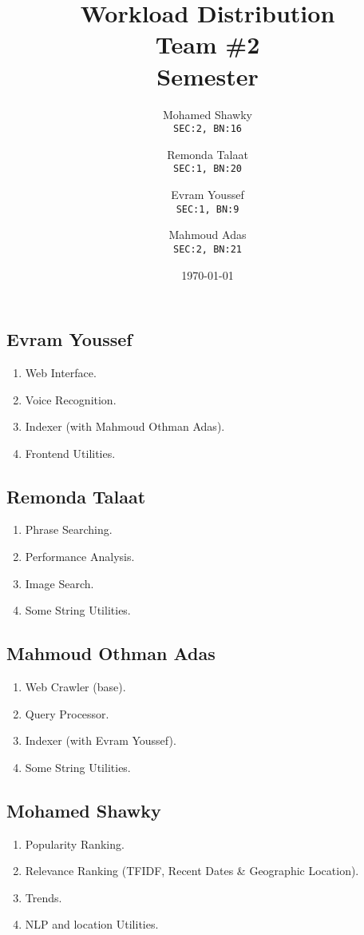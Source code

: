 \documentclass[12pt]{article}
\title{\textbf{Workload Distribution}\\Team \#2\\ Semester}
\author{
  Mohamed Shawky\\
  \small\texttt{SEC:2, BN:16}
  \and
  Remonda Talaat\\
  \small\texttt{SEC:1, BN:20}
  \and
  Evram Youssef\\
  \small\texttt{SEC:1, BN:9}
  \and
  Mahmoud Adas\\
  \small\texttt{SEC:2, BN:21}
}
\date{\today}
\begin{document}
\thispagestyle{empty}

\maketitle
\clearpage


\subsection*{Evram Youssef}
\begin{enumerate}
  \item Web Interface.
  \item Voice Recognition.
  \item Indexer (with Mahmoud Othman Adas).
  \item Frontend Utilities.
\end{enumerate}

\subsection*{Remonda Talaat}
\begin{enumerate}
  \item Phrase Searching.
  \item Performance Analysis.
  \item Image Search.
  \item Some String Utilities.
\end{enumerate}

\subsection*{Mahmoud Othman Adas}
\begin{enumerate}
  \item Web Crawler (base).
  \item Query Processor.
  \item Indexer (with Evram Youssef).
  \item Some String Utilities.
\end{enumerate}

\subsection*{Mohamed Shawky}
\begin{enumerate}
  \item Popularity Ranking.
  \item Relevance Ranking (TF\-IDF, Recent Dates \& Geographic Location).
  \item Trends.
  \item NLP and location Utilities.
\end{enumerate}
\end{document}
